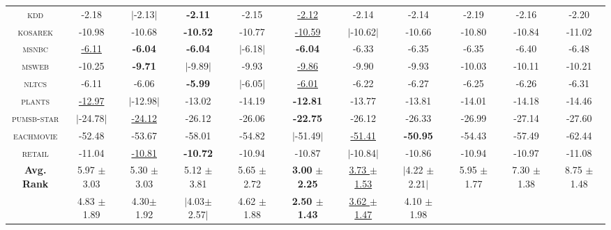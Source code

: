 \begin{sidewaystable}[ph!]
{\begin{tabular}{c|ccccc|ccccc}
    \textsc{kdd       } & -2.18 & $|$-2.13$|$ & \textbf{-2.11} & -2.15 & \underline{-2.12} & -2.14 & -2.14 & -2.19 & -2.16 & -2.20\\
    \textsc{kosarek   } & -10.98 & -10.68 & \textbf{-10.52} & -10.77 & \underline{-10.59} & $|$-10.62$|$ & -10.66 & -10.80 & -10.84 & -11.02\\
    \textsc{msnbc     } & \underline{-6.11} & \textbf{-6.04} & \textbf{-6.04} & $|$-6.18$|$ & \textbf{-6.04} & -6.33 & -6.35 & -6.35 & -6.40 & -6.48\\
    \textsc{msweb     } & -10.25 & \textbf{-9.71} & $|$-9.89$|$ & -9.93 & \underline{-9.86} & -9.90 & -9.93 & -10.03 & -10.11 & -10.21\\
    \textsc{nltcs     } & -6.11 & -6.06 & \textbf{-5.99} & $|$-6.05$|$ & \underline{-6.01} & -6.22 & -6.27 & -6.25 & -6.26 & -6.31\\
    \textsc{plants    } & \underline{-12.97} & $|$-12.98$|$ & -13.02 & -14.19 & \textbf{-12.81} & -13.77 & -13.81 & -14.01 & -14.18 & -14.46\\
    \textsc{pumsb-star} & $|$-24.78$|$ & \underline{-24.12} & -26.12 & -26.06 & \textbf{-22.75} & -26.12 & -26.33 & -26.99 & -27.14 & -27.60\\
    \textsc{eachmovie } & -52.48 & -53.67 & -58.01 & -54.82 & $|$-51.49$|$ & \underline{-51.41} & \textbf{-50.95} & -54.43 & -57.49 & -62.44\\
    \textsc{retail    } & -11.04 & \underline{-10.81} & \textbf{-10.72} & -10.94 & -10.87 & $|$-10.84$|$ & -10.86 & -10.94 & -10.97 & -11.08\\
    \hline
    \multirow{2}{*}[-0.15em]{\textbf{Avg. Rank}} & 5.97 $\pm$ 3.03 & 5.30 $\pm$ 3.03 & 5.12 $\pm$ 3.81 & 5.65 $\pm$ 2.72 & \textbf{3.00} $\pm$ \textbf{2.25} & \underline{3.73 $\pm$ 1.53} & $|$4.22 $\pm$ 2.21$|$ & 5.95 $\pm$ 1.77 & 7.30 $\pm$ 1.38 & 8.75 $\pm$ 1.48 \\
                                                 & 4.83 $\pm$ 1.89 & 4.30$ \pm$ 1.92 & $|$4.03$ \pm$ 2.57$|$ & 4.62 $\pm$ 1.88 & \textbf{2.50 $\pm$ 1.43} & \underline{3.62 $\pm$ 1.47} & 4.10 $\pm$ 1.98 \\
    \hline
  \end{tabular}
  }

\end{sidewaystable}
